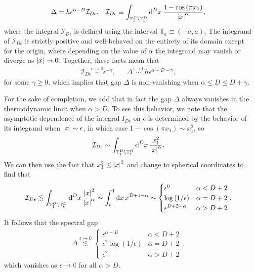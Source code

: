 \documentclass[nofootinbib,notitlepage,11pt]{revtex4-2}
\newcommand{\f}[2]{\dfrac{#1}{#2}} %
\newcommand{\p}[1]{\left(#1\right)} %
\newcommand{\1}{\mathds{1}}
\renewcommand{\d}{\text{d}}
\newcommand{\I}{\mathcal{I}}
\newcommand{\TT}{\mathbb{T}}
\begin{document}
\begin{align}
  \Delta = h \epsilon^{\alpha-D} \I_{D\epsilon},
  &&
  \I_{D\epsilon}
  \equiv \int_{\TT_1^D\setminus\TT_\epsilon^D} \d^Dx\,
  \f{1-\cos\p{\pi x_1}}{\abs{x}^\alpha},
\end{align}
where the integral $\I_{D\epsilon}$ is defined using the interval
$\TT_a\equiv\p{-a,a}$.  The integrand of $\I_{D\epsilon}$ is strictly
positive and well-behaved on the entirety of its domain except for the
origin, where depending on the value of $\alpha$ the integrand may
vanish or diverge as $\abs{x}\to0$.  Together, these facts mean that
\begin{align}
  \I_{D\epsilon} \stackrel{\epsilon\to0}{\sim} \epsilon^{-\gamma},
  &&
  \Delta \stackrel{\epsilon\to0}{\sim} h \epsilon^{\alpha-D-\gamma},
\end{align}
for some $\gamma\ge0$, which implies that gap $\Delta$ is
non-vanishing when $\alpha\le D\le D+\gamma$.

For the sake of completion, we add that in fact the gap $\Delta$
always vanishes in the thermodynamic limit when $\alpha>D$.  To see
this behavior, we note that the asymptotic dependence of the integral
$I_{D\epsilon}$ on $\epsilon$ is determined by the behavior of its
integrand when $\abs{x}\sim\epsilon$, in which case
$1-\cos\p{\pi x_1}\sim x_1^2$, so
\begin{align}
  \I_{D\epsilon}
  \sim \int_{\TT_1^D\setminus\TT_\epsilon^D} \d^Dx\,
  \f{x_1^2}{\abs{x}^\alpha}.
\end{align}
We can then use the fact that $x_1^2\le\abs{x}^2$ and change to
spherical coordinates to find that
\begin{align}
  \I_{D\epsilon} \lesssim
  \int_{\TT_1^D\setminus\TT_\epsilon^D} \d^Dx\,
  \f{\abs{x}^2}{\abs{x}^\alpha}
  \sim \int_\epsilon^1 \d x\, x^{D+1-\alpha}
  \sim
  \begin{cases}
    \epsilon^0 & \alpha < D+2 \\
    \log\p{1/\epsilon} & \alpha = D+2 \\
    \epsilon^{D+2-\alpha} & \alpha > D+2
  \end{cases}.
\end{align}
It follows that the spectral gap
\begin{align}
  \Delta \stackrel{\epsilon\to0}{\lesssim}
  \begin{cases}
    \epsilon^{\alpha-D} & \alpha < D+2 \\
    \epsilon^2 \log\p{1/\epsilon} & \alpha = D + 2 \\
    \epsilon^2 & \alpha > D+2
  \end{cases},
\end{align}
which vanishes as $\epsilon\to0$ for all $\alpha>D$.
\end{document}
